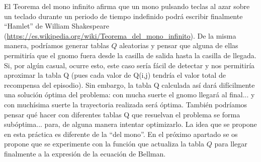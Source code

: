 \documentclass{article}
\begin{document}
El Teorema del mono infinito afirma que un mono pulsando teclas al azar sobre un teclado durante un periodo de tiempo indefinido podrá escribir finalmente ``Hamlet'' de William Shakespeare (\url{https://es.wikipedia.org/wiki/Teorema_del_mono_infinito}). De la misma manera, podríamos generar tablas $Q$ aleatorias y pensar que alguna de ellas permitiría que el gnomo fuera desde la casilla de salida hasta la casilla de llegada. Si, por algún casual, ocurre esto, este caso sería fácil de detectar y nos permitiría aproximar la tabla Q (pues cada valor de Q(i,j) tendría el valor total de recompensa del episodio). Sin embargo, la tabla Q calculada así dará difícilmente una solución óptima del problema: con mucha suerte el gnomo llegará al final... y con muchísima suerte la trayectoria realizada será óptima. También podríamos pensar qué hacer con diferentes tablas Q que resuelvan el problema se forma subóptima... para, de alguna manera intentar optimizarlo. La idea que se propone en esta práctica es diferente de la ``del mono''. En el próximo apartado se os propone que se experimente con la función que actualiza la tabla $Q$ para llegar finalmente a la expresión de la ecuación de Bellman.
\end{document}

